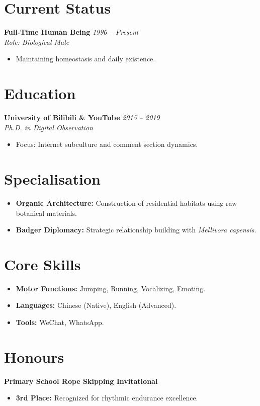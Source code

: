 \documentclass[10pt, a4paper]{article}
\begin{document}
\section{Current Status}
\textbf{Full-Time Human Being} \hfill \textit{1996 -- Present} \\
\textit{\footnotesize Role: Biological Male}
\begin{itemize}
    \item Maintaining homeostasis and daily existence.
\end{itemize}

\section{Education}
\textbf{University of Bilibili \& YouTube} \hfill \textit{2015 -- 2019} \\
\textit{\footnotesize Ph.D. in Digital Observation}
\begin{itemize}
    \item Focus: Internet subculture and comment section dynamics.
\end{itemize}

\section{Specialisation}
\begin{itemize}
    \item \textbf{Organic Architecture:} Construction of residential habitats using raw botanical materials.
    \item \textbf{Badger Diplomacy:} Strategic relationship building with \textit{Mellivora capensis}.
\end{itemize}

\section{Core Skills}
\begin{itemize}
    \item \textbf{Motor Functions:} Jumping, Running, Vocalizing, Emoting.
    \item \textbf{Languages:} Chinese (Native), English (Advanced).
    \item \textbf{Tools:} WeChat, WhatsApp.
\end{itemize}

\section{Honours}
\textbf{Primary School Rope Skipping Invitational} 
\begin{itemize}
    \item \textbf{3rd Place:} Recognized for rhythmic endurance excellence.
\end{itemize}
\end{document}
